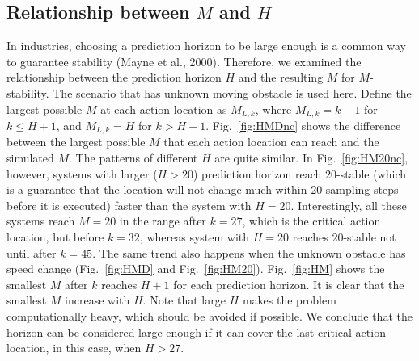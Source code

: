 \documentclass{ifacconf}
\begin{document}
\subsection{Relationship between $M$ and $H$}

In industries, choosing a prediction horizon to be large enough is a common way to guarantee stability (Mayne et al., 2000). Therefore, we examined the relationship between the prediction horizon $H$ and the resulting $M$ for $M$-stability. The scenario that has unknown moving obstacle is used here. Define the largest possible $M$ at each action location as $M_{L,k}$, where $M_{L,k} = k-1$ for $k\leq H+1$, and $M_{L,k} = H$ for $k>H+1$. Fig.~\ref{fig:HMDnc} shows the difference between the largest possible $M$ that each action location can reach and the simulated $M$. The patterns of different $H$ are quite similar. In Fig.~\ref{fig:HM20nc}, however, systems with larger ($H>20$) prediction horizon reach $20$-stable (which is a guarantee that the location will not change much within 20 sampling steps before it is executed) faster than the system with $H=20$. Interestingly, all these systems reach $M=20$ in the range after $k=27$, which is the critical action location, but before $k=32$, whereas system with $H=20$ reaches $20$-stable not until after $k=45$. The same trend also happens when the unknown obstacle has speed change (Fig.~\ref{fig:HMD} and Fig.~\ref{fig:HM20}). Fig.~\ref{fig:HM} shows the smallest $M$ after $k$ reaches $H+1$ for each prediction horizon. It is clear that the smallest $M$ increase with $H$. Note that large $H$ makes the problem computationally heavy, which should be avoided if possible. We conclude that the horizon can be considered large enough if it can cover the last critical action location, in this case, when $H>27$.
\end{document}
